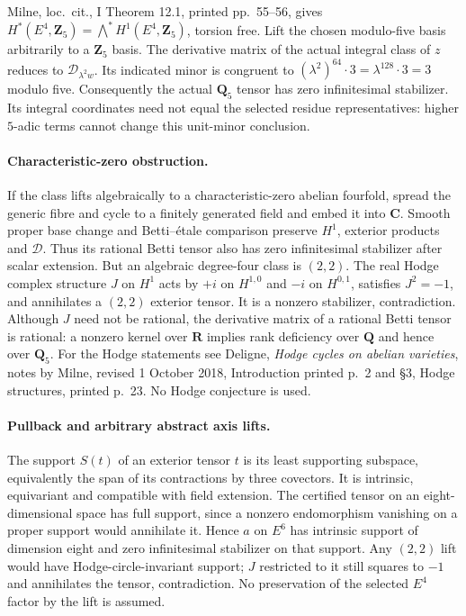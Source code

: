 \documentclass[11pt]{article}
\theoremstyle{remark}\newtheorem{remark}[theorem]{Remark}
\begin{document}
Milne, loc.\ cit., I Theorem 12.1, printed pp.~55--56, gives
$H^*(E^4,\mathbf Z_5)=\bigwedge^*H^1(E^4,\mathbf Z_5)$,
torsion free. Lift the chosen modulo-five basis arbitrarily to a
$\mathbf Z_5$ basis. The derivative matrix of the actual integral
class of $z$ reduces to $\mathcal D_{\lambda^2w}$.
Its indicated minor is congruent to
$(\lambda^2)^{64}\cdot3=\lambda^{128}\cdot3=3$ modulo five.
Consequently the actual $\mathbf Q_5$ tensor has zero infinitesimal
stabilizer. Its integral coordinates need not equal the selected
residue representatives: higher $5$-adic terms cannot change
this unit-minor conclusion.

\paragraph{Characteristic-zero obstruction.}
If the class lifts algebraically to a characteristic-zero abelian
fourfold, spread the generic fibre and cycle to a finitely generated
field and embed it into $\mathbf C$. Smooth proper base change and
Betti--\'etale comparison preserve $H^1$, exterior products and
$\mathcal D$. Thus its rational Betti tensor also has zero
infinitesimal stabilizer after scalar extension.
But an algebraic degree-four class is $(2,2)$.
The real Hodge complex structure $J$ on $H^1$ acts by $+i$ on
$H^{1,0}$ and $-i$ on $H^{0,1}$, satisfies $J^2=-1$, and
annihilates a $(2,2)$ exterior tensor. It is a nonzero stabilizer,
contradiction. Although $J$ need not be rational, the derivative
matrix of a rational Betti tensor is rational: a nonzero kernel
over $\mathbf R$ implies rank deficiency over $\mathbf Q$ and
hence over $\mathbf Q_5$.
For the Hodge statements see Deligne, \emph{Hodge cycles on abelian
varieties}, notes by Milne, revised 1 October 2018, Introduction
printed p.~2 and \S3, Hodge structures, printed p.~23.
No Hodge conjecture is used.

\paragraph{Pullback and arbitrary abstract axis lifts.}
The support $S(t)$ of an exterior tensor $t$ is its least supporting
subspace, equivalently the span of its contractions by three
covectors. It is intrinsic, equivariant and compatible with field
extension. The certified tensor on an eight-dimensional space has
full support, since a nonzero endomorphism vanishing on a proper
support would annihilate it.
Hence $a$ on $E^6$ has intrinsic support of dimension eight and
zero infinitesimal stabilizer on that support.
Any $(2,2)$ lift would have Hodge-circle-invariant support;
$J$ restricted to it still squares to $-1$ and annihilates the
tensor, contradiction. No preservation of the selected $E^4$
factor by the lift is assumed.
\end{document}
